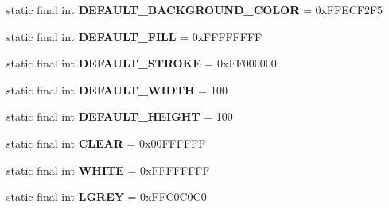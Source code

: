\begin{DoxyCompactItemize}
\item 
\hypertarget{interfacehype_1_1core_1_1util_1_1_h_constants_a4736f0e0f4f1737d893d7e7f79f99a43}{static final int {\bfseries D\-E\-F\-A\-U\-L\-T\-\_\-\-B\-A\-C\-K\-G\-R\-O\-U\-N\-D\-\_\-\-C\-O\-L\-O\-R} = 0x\-F\-F\-E\-C\-F2\-F5}\label{interfacehype_1_1core_1_1util_1_1_h_constants_a4736f0e0f4f1737d893d7e7f79f99a43}

\item 
\hypertarget{interfacehype_1_1core_1_1util_1_1_h_constants_a089f77b3d08bb4874794dbf482eab532}{static final int {\bfseries D\-E\-F\-A\-U\-L\-T\-\_\-\-F\-I\-L\-L} = 0x\-F\-F\-F\-F\-F\-F\-F\-F}\label{interfacehype_1_1core_1_1util_1_1_h_constants_a089f77b3d08bb4874794dbf482eab532}

\item 
\hypertarget{interfacehype_1_1core_1_1util_1_1_h_constants_a2cb9fd0f99922524686da8008590de24}{static final int {\bfseries D\-E\-F\-A\-U\-L\-T\-\_\-\-S\-T\-R\-O\-K\-E} = 0x\-F\-F000000}\label{interfacehype_1_1core_1_1util_1_1_h_constants_a2cb9fd0f99922524686da8008590de24}

\item 
\hypertarget{interfacehype_1_1core_1_1util_1_1_h_constants_a5528f9642cc29c9fbbbe53bb7bc83f78}{static final int {\bfseries D\-E\-F\-A\-U\-L\-T\-\_\-\-W\-I\-D\-T\-H} = 100}\label{interfacehype_1_1core_1_1util_1_1_h_constants_a5528f9642cc29c9fbbbe53bb7bc83f78}

\item 
\hypertarget{interfacehype_1_1core_1_1util_1_1_h_constants_a78fb9e1ea7e34edbd6ebfa29c88cf6ca}{static final int {\bfseries D\-E\-F\-A\-U\-L\-T\-\_\-\-H\-E\-I\-G\-H\-T} = 100}\label{interfacehype_1_1core_1_1util_1_1_h_constants_a78fb9e1ea7e34edbd6ebfa29c88cf6ca}

\item 
\hypertarget{interfacehype_1_1core_1_1util_1_1_h_constants_aae42c4a02c3b7107950431f546130dfd}{static final int {\bfseries C\-L\-E\-A\-R} = 0x00\-F\-F\-F\-F\-F\-F}\label{interfacehype_1_1core_1_1util_1_1_h_constants_aae42c4a02c3b7107950431f546130dfd}

\item 
\hypertarget{interfacehype_1_1core_1_1util_1_1_h_constants_ae2c416a1a0839435d8bb78a99ffcc6a2}{static final int {\bfseries W\-H\-I\-T\-E} = 0x\-F\-F\-F\-F\-F\-F\-F\-F}\label{interfacehype_1_1core_1_1util_1_1_h_constants_ae2c416a1a0839435d8bb78a99ffcc6a2}

\item 
\hypertarget{interfacehype_1_1core_1_1util_1_1_h_constants_ac6fd740a518ee3b13b9a5fd935e4ec3b}{static final int {\bfseries L\-G\-R\-E\-Y} = 0x\-F\-F\-C0\-C0\-C0}\label{interfacehype_1_1core_1_1util_1_1_h_constants_ac6fd740a518ee3b13b9a5fd935e4ec3b}


\end{DoxyCompactItemize}
